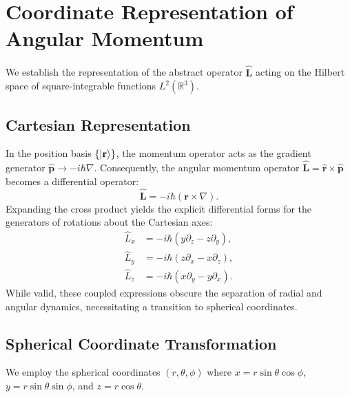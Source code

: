 \section{Coordinate Representation of Angular Momentum}

We establish the representation of the abstract operator $\hat{\mathbf{L}}$
acting on the Hilbert space of square-integrable functions $L^2(\mathbb{R}^3)$.

\subsection{Cartesian Representation}

In the position basis $\{\ket{\mathbf{r}}\}$, the momentum operator acts as the
gradient generator $\hat{\mathbf{p}} \to -i\hbar \nabla$. Consequently, the
angular momentum operator $\hat{\mathbf{L}} = \hat{\mathbf{r}} \times
\hat{\mathbf{p}}$ becomes a differential operator:
\begin{equation}
  \hat{\mathbf{L}} = -i\hbar (\mathbf{r} \times \nabla).
\end{equation}
Expanding the cross product yields the explicit differential forms for the
generators of rotations about the Cartesian axes:
\begin{align}
  \hat{L}_x &= -i\hbar \left( y \partial_z - z \partial_y \right), \nonumber \\
  \hat{L}_y &= -i\hbar \left( z \partial_x - x \partial_z \right), \nonumber \\
  \hat{L}_z &= -i\hbar \left( x \partial_y - y \partial_x \right).
\end{align}
While valid, these coupled expressions obscure the separation of radial and
angular dynamics, necessitating a transition to spherical coordinates.

\subsection{Spherical Coordinate Transformation}

We employ the spherical coordinates $(r, \theta, \phi)$ where $x = r \sin\theta
\cos\phi$, $y = r \sin\theta \sin\phi$, and $z = r \cos\theta$.

